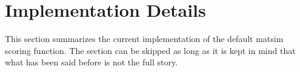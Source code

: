 

\section{Implementation Details}
\label{sec:scoring-current}
This section summarizes the current implementation of the default \gls{matsim} scoring function. The section can be skipped as long as it is kept in mind that what has been said before is not the full story.

%

